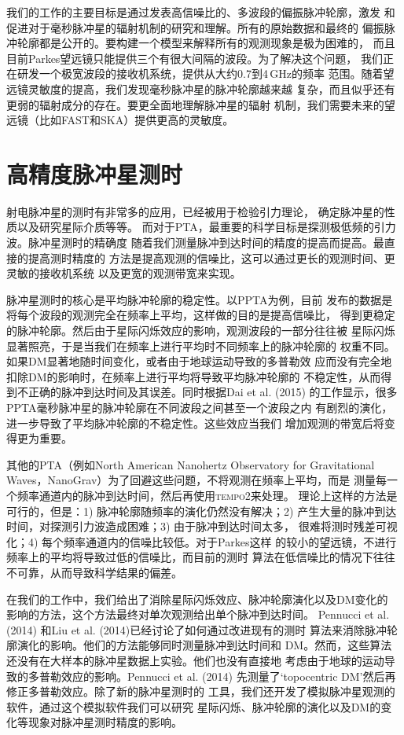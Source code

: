 我们的工作的主要目标是通过发表高信噪比的、多波段的偏振脉冲轮廓，激发
和促进对于毫秒脉冲星的辐射机制的研究和理解。所有的原始数据和最终的
偏振脉冲轮廓都是公开的。要构建一个模型来解释所有的观测现象是极为困难的，
而且目前Parkes望远镜只能提供三个有很大间隔的波段。为了解决这个问题，
我们正在研发一个极宽波段的接收机系统，提供从大约0.7到4\,GHz的频率
范围。随着望远镜灵敏度的提高，我们发现毫秒脉冲星的脉冲轮廓越来越
复杂，而且似乎还有更弱的辐射成分的存在。要更全面地理解脉冲星的辐射
机制，我们需要未来的望远镜（比如FAST和SKA）提供更高的灵敏度。

\section{高精度脉冲星测时}

射电脉冲星的测时有非常多的应用，已经被用于检验引力理论\supercite{Kramer06}，
确定脉冲星的性质\supercite{Antoniadis}以及研究星际介质\supercite{Keith13}等等。
而对于PTA，最重要的科学目标是探测极低频的引力波。脉冲星测时的精确度
随着我们测量脉冲到达时间的精度的提高而提高。最直接的提高测时精度的
方法是提高观测的信噪比，这可以通过更长的观测时间、更灵敏的接收机系统
以及更宽的观测带宽来实现。

脉冲星测时的核心是平均脉冲轮廓的稳定性。以PPTA为例，目前
发布的数据是将每个波段的观测完全在频率上平均，这样做的目的是提高信噪比，
得到更稳定的脉冲轮廓。然后由于星际闪烁效应的影响，观测波段的一部分往往被
星际闪烁显著照亮，于是当我们在频率上进行平均时不同频率上的脉冲轮廓的
权重不同。如果DM显著地随时间变化，或者由于地球运动导致的多普勒效
应而没有完全地扣除DM的影响时，在频率上进行平均将导致平均脉冲轮廓的
不稳定性，从而得到不正确的脉冲到达时间及其误差。同时根据Dai et al. (2015)\supercite{dhm+15}
的工作显示，很多PPTA毫秒脉冲星的脉冲轮廓在不同波段之间甚至一个波段之内
有剧烈的演化，进一步导致了平均脉冲轮廓的不稳定性。这些效应当我们
增加观测的带宽后将变得更为重要。

其他的PTA（例如North American Nanohertz Observatory for Gravitational 
Waves，NanoGrav）为了回避这些问题，不将观测在频率上平均，而是
测量每一个频率通道内的脉冲到达时间，然后再使用\textsc{tempo2}来处理。
理论上这样的方法是可行的，但是：1) 脉冲轮廓随频率的演化仍然没有解决；2) 
产生大量的脉冲到达时间，对探测引力波造成困难；3) 由于脉冲到达时间太多，
很难将测时残差可视化；4) 每个频率通道内的信噪比较低。对于Parkes这样
的较小的望远镜，不进行频率上的平均将导致过低的信噪比，而目前的测时
算法在低信噪比的情况下往往不可靠，从而导致科学结果的偏差。

在我们的工作中，我们给出了消除星际闪烁效应、脉冲轮廓演化以及DM变化的
影响的方法，这个方法最终对单次观测给出单个脉冲到达时间。
Pennucci et al. (2014)\supercite{Pennucci14}
和Liu et al. (2014)\supercite{Liu14}已经讨论了如何通过改进现有的测时
算法来消除脉冲轮廓演化的影响。他们的方法能够同时测量脉冲到达时间和
DM。然而，这些算法还没有在大样本的脉冲星数据上实验。他们也没有直接地
考虑由于地球的运动导致的多普勒效应的影响。Pennucci et al. (2014)
先测量了`topocentric DM'然后再修正多普勒效应。除了新的脉冲星测时的
工具，我们还开发了模拟脉冲星观测的软件，通过这个模拟软件我们可以研究
星际闪烁、脉冲轮廓的演化以及DM的变化等现象对脉冲星测时精度的影响。

